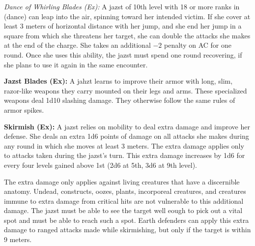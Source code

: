 {

\textit{Dance of Whirling Blades (Ex):} A jazst of 10th level with 18 or more ranks in  (dance) can leap into the air, spinning toward her intended victim. If she cover at least 3 meters of horizontal distance with her jump, and she end her jump in a square from which she threatens her target, she can double the attacks she makes at the end of the charge. She takes an additional $-2$ penalty on AC for one round. Once she uses this ability, the jazst must spend one round recovering, if she plans to use it again in the same encounter.

\textbf{Jazst Blades (Ex):} A jahzt learns to improve their armor with long, slim, razor-like weapons they carry mounted on their legs and arms. These specialized weapons deal 1d10 slashing damage. They otherwise follow the same rules of armor spikes. 

\textbf{Skirmish (Ex):} A jazst relies on mobility to deal extra damage and improve her defense. She deals an extra 1d6 points of damage on all attacks she makes during any round in which she moves at least 3 meters. The extra damage applies only to attacks taken during the jazst's turn. This extra damage increases by 1d6 for every four levels gained above 1st (2d6 at 5th, 3d6 at 9th level).

The extra damage only applies against living creatures that have a discernible anatomy. Undead, constructs, oozes, plants, incorporeal creatures, and creatures immune to extra damage from critical hits are not vulnerable to this additional damage. The jazst must be able to see the target well eough to pick out a vital spot and must be able to reach such a spot. Earth defenders can apply this extra damage to ranged attacks made while skirmishing, but only if the target is within 9 meters.

}
